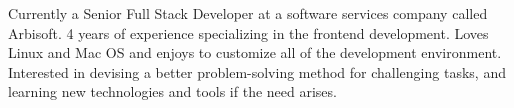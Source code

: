 

\begin{cvparagraph}

Currently a Senior Full Stack Developer at a software services company called Arbisoft. 4 years of experience specializing in the frontend development. Loves Linux and Mac OS and enjoys to customize all of the development environment. Interested in devising a better problem-solving method for challenging tasks, and learning new technologies and tools if the need arises.
\end{cvparagraph}
